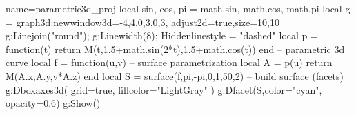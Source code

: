 \documentclass[12pt]{standalone} %
\begin{document}
\begin{luadraw}{name=parametric3d_proj}
local sin, cos, pi = math.sin, math.cos, math.pi
local g = graph3d:new{window3d={-4,4,0,3,0,3}, adjust2d=true,size={10,10}}
g:Linejoin("round"); g:Linewidth(8); Hiddenlinestyle = "dashed"
local p = function(t) return M(t,1.5+math.sin(2*t),1.5+math.cos(t)) end -- parametric 3d curve
local f = function(u,v) -- surface parametrization
    local A = p(u) 
    return M(A.x,A.y,v*A.z)
end 
local S = surface(f,pi,-pi,0,1,{50,2}) -- build surface (facets)
g:Dboxaxes3d( {grid=true, fillcolor="LightGray"} )
g:Dfacet(S,{color="cyan", opacity=0.6})
g:Show()
\end{luadraw}
\end{document}
